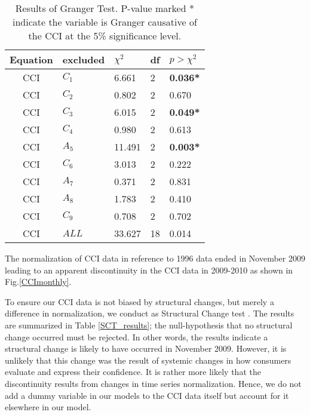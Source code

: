 \documentclass[10pt]{article}
\begin{document}
\begin {table}
\begin {center}
\begin {tabular} {cllll}
\hline
Equation	&	excluded	&	$\chi^2$	&	df	&	$p>\chi^2$	\\
\hline
CCI	&	$C_1$	&	6.661	&	2	&	\textbf{0.036*}	\\
CCI	&	$C_2$	&	0.802	&	2	&	0.670	 	\\
CCI	&	$C_3$	&	6.015	&	2	&	\textbf{0.049*}	\\
CCI	&	$C_4$	&	0.980	&	2	&	0.613		\\
CCI	&	$A_5$	&	11.491	&	2	&	\textbf{0.003*}	\\
CCI	&	$C_6$	&	3.013	&	2	&	0.222		\\
CCI	&	$A_7$	&	0.371	&	2	&	0.831		\\
CCI	&	$A_8$	&	1.783	&	2	&	0.410		\\
CCI	&	$C_9$	&	0.708	&	2	&	0.702		\\
CCI	&	$ALL$     &	33.627	&	18	&	0.014		\\
\hline
\end {tabular}
\caption{ \label{Granger} Results of Granger Test. P-value marked * indicate the variable is Granger causative of the CCI at the 5\% significance level.}
\end {center}
\end {table}


The normalization of CCI data in reference to 1996 data \cite{Center2010} ended in November 2009 leading to an apparent discontinuity in the CCI data in 2009-2010 as shown in Fig.\ref{CCImonthly}.

To ensure our CCI data is not biased by structural changes, but merely a difference in normalization, we conduct as Structural Change test \cite{Pasinetti1981}. The results are summarized in Table \ref{SCT_results}; the null-hypothesis that no structural change occurred must be rejected. In other words, the results indicate a structural change is likely to have occurred in November 2009. However, it is unlikely that this change was the result of systemic changes in how consumers evaluate and express their confidence. It is rather more likely that the discontinuity results from changes in time series normalization. Hence, we do not add a dummy variable in our models to the CCI data itself but account for it elsewhere in our model.\\
\end{document}

